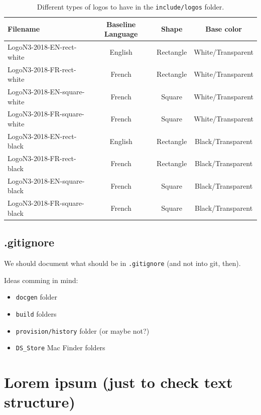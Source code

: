 \begin{table}[ht]
	\centering
	\begin{tabular}{@{}lccc@{}}
	\toprule
        Filename                        &   Baseline Language   &   Shape   & Base color \\ \midrule
        LogoN3-2018-EN-rect-white       &   English             & Rectangle & White/Transparent \\
        LogoN3-2018-FR-rect-white       &   French              & Rectangle & White/Transparent \\
        LogoN3-2018-EN-square-white     &   French              & Square    & White/Transparent \\
        LogoN3-2018-FR-square-white     &   French              & Square    & White/Transparent \\
        LogoN3-2018-EN-rect-black       &   English             & Rectangle & Black/Transparent \\
        LogoN3-2018-FR-rect-black       &   French              & Rectangle & Black/Transparent \\
        LogoN3-2018-EN-square-black     &   French              & Square    & Black/Transparent \\
        LogoN3-2018-FR-square-black     &   French              & Square    & Black/Transparent \\ \bottomrule
	\end{tabular}
	\caption{Different types of logos to have in the \texttt{include/logos} folder.}
	\label{table:logoformats}
\end{table}

\subsection{.gitignore}

We should document what should be in \texttt{.gitignore} (and not into git, then).

Ideas comming in mind:

\begin{itemize}
    \item \texttt{docgen} folder
    \item \texttt{build} folders
    \item \texttt{provision/history} folder (or maybe not?)
    \item \texttt{DS\_Store} Mac Finder folders
\end{itemize}

\section{Lorem ipsum (just to check text structure)}

\lipsum
